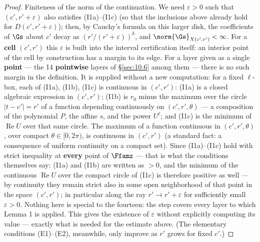 \begin{proof}
Finiteness of the norm of the continuation. We need $\varepsilon > 0$ such that
$(c', r'+\varepsilon)$ also satisfies (I1a)--(I1c) (so that the inclusions above
already hold for $D(c',r'+\varepsilon)$); then, by Cauchy's formula on this
larger disk, the coefficients of $\Gs$ about $c'$ decay as
$(r'/(r'+\varepsilon))^k$, and $\norm{\Gs}_{X(c',r')} < \infty$. For a \textbf{cell} $(c',r')$
this $\varepsilon$ is built into the interval certification itself: an interior
point of the cell by construction has a margin to its edge. For a layer given
as a single \textbf{point} --- the 14 \textbf{pointwise} layers of
\S\ref{sec:10.6} among them --- there is no such margin in the
definition. It is supplied without a new computation: for a fixed
$\ell$-box, each of (I1a), (I1b), (I1c) is continuous
in $(c',r')$: (I1a) is a closed algebraic expression in $(c',r')$; (I1b) is
$r_0$ minus the maximum over the circle $|t-c'|=r'$ of a function depending
continuously on $(c',r',\theta)$ --- a composition of the
polynomial $P$, the affine $s$, and the power $U^\ell$; and (I1c) is the
minimum of $\operatorname{Re} U$ over that same circle. The maximum of a
function continuous in $(c',r',\theta)$, over compact $\theta\in[0,2\pi)$, is
continuous in $(c',r')$ (a standard fact: a consequence of uniform
continuity on a compact set). Since (I1a)--(I1c) hold with strict inequality
at \textbf{every} point of $\Ffamz$ --- that is what the conditions themselves
say: (I1a) and (I1b) are written as $>0$, and the minimum of the continuous
$\operatorname{Re} U$ over the compact circle of (I1c) is therefore positive as
well --- by continuity they
remain strict also in some open neighborhood of that point in the
space $(c',r')$; in particular along the ray $r' \to r'+\varepsilon$ for
sufficiently small $\varepsilon > 0$. Nothing here is special to the fourteen:
the step covers every layer to which Lemma 1 is applied.
This gives the existence of $\varepsilon$ without
explicitly computing its value --- exactly what is needed for the
estimate above. (The elementary conditions (E1)--(E2), meanwhile, only improve as $r'$ grows for fixed $c'$.)


\end{proof}
